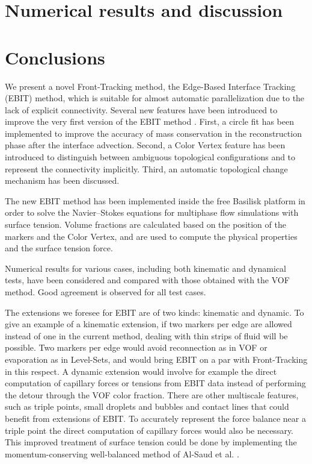 \documentclass[preprint, 12pt]{elsarticle}
\begin{document}
\section{Numerical results and discussion} \label{Numerical results and discussion}


\section{Conclusions}
We present a novel Front-Tracking method, the Edge-Based Interface Tracking (EBIT) method, which is suitable for almost automatic parallelization due to the lack of explicit connectivity.
Several new features have been introduced to improve the very first version of the EBIT method \cite{Chirco_2022_95}. First, a circle fit has been implemented to improve the accuracy of mass conservation in the reconstruction phase after the interface advection.
Second, a Color Vertex feature has been introduced to distinguish between ambiguous topological configurations and to represent the connectivity implicitly. Third, an automatic topological change mechanism has been discussed.

The new EBIT method has been implemented inside the free Basilisk platform in order to solve the Navier--Stokes equations for multiphase flow simulations with surface tension. Volume fractions are calculated based on the position of the markers and the Color Vertex, and are used to compute the physical properties and the surface tension force.

Numerical results for various cases, including both kinematic and dynamical tests, have been considered and compared with those obtained with the VOF method. Good agreement is observed for all test cases.

The extensions we foresee for EBIT are of two kinds: kinematic and dynamic. To give an example of a kinematic extension, if two markers per edge are allowed instead of one in the current method, dealing with thin strips of fluid will be possible. Two markers per edge would avoid reconnection as in VOF or evaporation as in Level-Sets, and would bring EBIT on a par with Front-Tracking in this respect. A dynamic extension would involve for example the direct computation of capillary forces or tensions from EBIT data instead of performing the detour through the VOF color fraction. There are other multiscale features, such as triple points, small droplets and bubbles and contact lines that could benefit from extensions of EBIT. To accurately represent the force balance near a triple point the direct computation of capillary forces would also be necessary. This improved treatment of surface tension could be done by implementing the momentum-conserving well-balanced method of Al-Saud et al. \cite{abu2018conservative}.
\end{document}
